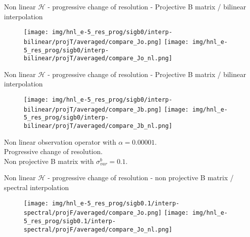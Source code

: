\documentclass[francais]{beamer}
\begin{document}
\begin{frame}{Non linear $\mathcal{H}$ - progressive change of resolution - Projective B matrix / bilinear interpolation}
\begin{center}
\begin{figure}
  \texttt{[image: img/hnl\_e-5\_res\_prog/sigb0/interp-bilinear/projT/averaged/compare\_Jo.png]}
\endminipage\hfill
{}
  \texttt{[image: img/hnl\_e-5\_res\_prog/sigb0/interp-bilinear/projT/averaged/compare\_Jo\_nl.png]}
\endminipage
\end{figure}
\end{center}
\end{frame}

\begin{frame}{Non linear $\mathcal{H}$ - progressive change of resolution - Projective B matrix / bilinear interpolation}
\begin{center}
\begin{figure}
  \texttt{[image: img/hnl\_e-5\_res\_prog/sigb0/interp-bilinear/projT/averaged/compare\_Jb.png]}
\endminipage\hfill
{}
  \texttt{[image: img/hnl\_e-5\_res\_prog/sigb0/interp-bilinear/projT/averaged/compare\_Jb\_nl.png]}
\endminipage
\end{figure}
\end{center}
\end{frame}

\begin{frame}
\begin{center}
Non linear observation operator with $\alpha=0.00001$.\\
Progressive change of resolution.\\
Non projective B matrix with $\sigma^b_{var} = 0.1$.
\end{center}
\end{frame}

\begin{frame}{Non linear $\mathcal{H}$ - progressive change of resolution - non projective B matrix / spectral interpolation}
\begin{center}
\begin{figure}
  \texttt{[image: img/hnl\_e-5\_res\_prog/sigb0.1/interp-spectral/projF/averaged/compare\_Jo.png]}
\endminipage\hfill
{}
  \texttt{[image: img/hnl\_e-5\_res\_prog/sigb0.1/interp-spectral/projF/averaged/compare\_Jo\_nl.png]}
\endminipage
\end{figure}
\end{center}
\end{frame}
\end{document}
